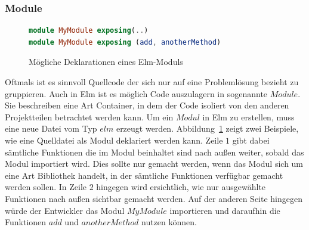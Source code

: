 \subsubsection{Module}
\label{sec:Module}
\begin{figure}[h]
\begin{lstlisting}[language=Elm]
module MyModule exposing(..)
module MyModule exposing (add, anotherMethod)
\end{lstlisting}
\caption{Mögliche Deklarationen eines Elm-Moduls}\label{fig:elm-module}
\end{figure}
Oftmals ist es sinnvoll Quellcode der sich nur auf eine Problemlösung bezieht zu gruppieren. Auch in Elm ist es möglich Code auszulagern in sogenannte $Module$. Sie beschreiben eine Art Container, in dem der Code isoliert von den anderen Projektteilen betrachtet werden kann. Um ein $Modul$ in Elm zu erstellen, muss eine neue Datei vom Typ $elm$ erzeugt werden. Abbildung~\ref{fig:elm-module} zeigt zwei Beispiele, wie eine Quelldatei als Modul deklariert werden kann. Zeile $1$ gibt dabei sämtliche Funktionen die im Modul beinhaltet sind nach außen weiter, sobald das Modul importiert wird. Dies sollte nur gemacht werden, wenn das Modul sich um eine Art Bibliothek handelt, in der sämtliche Funktionen verfügbar gemacht werden sollen. In Zeile $2$ hingegen wird ersichtlich, wie nur ausgewählte Funktionen nach außen sichtbar gemacht werden. Auf der anderen Seite hingegen würde der Entwickler das Modul $MyModule$ importieren und daraufhin die Funktionen $add$ und $anotherMethod$ nutzen können.

